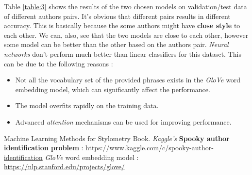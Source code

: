 \documentclass[letterpaper, 10 pt, conference]{ieeeconf}  %
\newcommand{\link}[1]{{\color{blue}\href{#1}{#1}}}
\begin{document}
Table \ref{table:3} shows the results of the two chosen models on validation/test data of different authors pairs. It's obvious that different pairs results in different accuracy. This is basically because the some authors might have \textbf{close style} to each other. We can, also, see that the two models are close to each other, however some model can be better than the other based on the authors pair. \emph{Neural networks} don't perform much better than linear classifiers for this dataset. This can be due to the following reasons :
\begin{itemize}
    \item Not all the vocabulary set of the provided phrases exists in the \emph{GloVe} word embedding model, which can significantly affect the performance.
    \item The model overfits rapidly on the training data.
    \item Advanced \emph{attention} mechanisms can be used for improving performance.
\end{itemize}


\begin{thebibliography}{99}
 Machine Learning Methods for Stylometry Book.
 \emph{Kaggle's} \textbf{Spooky author identification problem} : \link{https://www.kaggle.com/c/spooky-author-identification}
 \emph{GloVe} word embedding model : \link{https://nlp.stanford.edu/projects/glove/}
\end{thebibliography}

\end{document}

